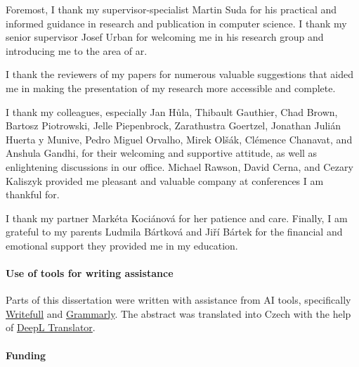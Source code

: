 \begin{thanks}
Foremost, I thank my supervisor-specialist Martin Suda for his practical and informed guidance in research and publication in computer science.
I thank my senior supervisor Josef Urban for welcoming me in his research group and introducing me to the area of \gls{ar}.

I thank the reviewers of my papers for numerous valuable suggestions that aided me in making the presentation of my research more accessible and complete.

I thank my colleagues, especially Jan Hůla, Thibault Gauthier, Chad Brown, Bartosz Piotrowski, Jelle Piepenbrock, Zarathustra Goertzel, Jonathan Julián Huerta y Munive, Pedro Miguel Orvalho, Mirek Olšák, Clémence Chanavat, and Anshula Gandhi, for their welcoming and supportive attitude, as well as enlightening discussions in our office.
Michael Rawson, David Cerna, and Cezary Kaliszyk provided me pleasant and valuable company at conferences I am thankful for.

I thank my partner Markéta Kociánová for her patience and care.
Finally, I am grateful to my parents Ludmila Bártková and Jiří Bártek for the financial and emotional support they provided me in my education.

\paragraph{Use of tools for writing assistance}

Parts of this dissertation were written with assistance from AI tools, specifically \href{https://www.writefull.com/}{Writefull} and \href{https://grammarly.com/}{Grammarly}.
The abstract was translated into Czech with the help of \href{https://www.deepl.com/}{DeepL Translator}.

\paragraph{Funding}



\end{thanks}
